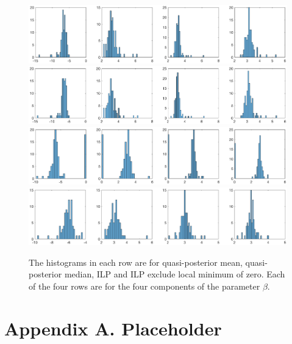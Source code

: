 \documentclass[12pt]{article}
\theoremstyle{plain} \newtheorem{theorem}{Theorem}
\theoremstyle{definition} \newtheorem{definition}{Definition}
\begin{document}
\begin{figure}[h]
    \centering
    \includegraphics[width=1.2\textwidth]{figures/lte-mean.eps}
    \includegraphics[width=1.2\textwidth]{figures/lte-median.eps}
    \includegraphics[width=1.2\textwidth]{figures/ilp-allrep.eps}
    \includegraphics[width=1.2\textwidth]{figures/ilp-exzero.eps}
    \caption{The histograms in each row are for quasi-posterior mean, quasi-posterior median, ILP and ILP exclude local minimum of zero. Each of the four rows are for the four components of the parameter $\beta$.}
    \label{fig:lte-mean}
\end{figure}


\clearpage

\nocite{*}




\clearpage

\section*{Appendix A. Placeholder} \label{sec:appendixa}
\end{document}
